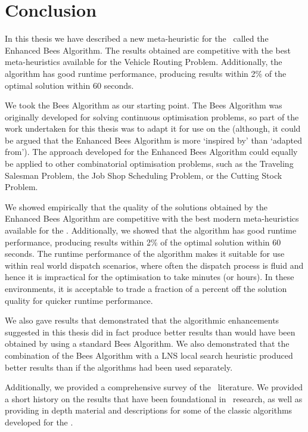 
\chapter{Conclusion}
\label{chap:conclusion}

In this thesis we have described a new meta-heuristic for the \VRP\ called the Enhanced Bees Algorithm. The results obtained are competitive with the best meta-heuristics available for the Vehicle Routing Problem. Additionally, the algorithm has good runtime performance, producing results within 2\% of the optimal solution within 60 seconds.

We took the Bees Algorithm as our starting point. The Bees Algorithm was originally developed for solving continuous optimisation problems, so part of the work undertaken for this thesis was to adapt it for use on the \VRP (although, it could be argued that the Enhanced Bees Algorithm is more `inspired by' than `adapted from'). The approach developed for the Enhanced Bees Algorithm could equally be applied to other combinatorial optimisation problems, such as the Traveling Salesman Problem, the Job Shop Scheduling Problem, or the Cutting Stock Problem.

We showed empirically that the quality of the solutions obtained by the Enhanced Bees Algorithm are competitive with the best modern meta-heuristics available for the \VRP. Additionally, we showed that the algorithm has good runtime performance, producing results within 2\% of the optimal solution within 60 seconds. The runtime performance of the algorithm makes it suitable for use within real world dispatch scenarios, where often the dispatch process is fluid and hence it is impractical for the optimisation to take minutes (or hours). In these environments, it is acceptable to trade a fraction of a percent off the solution quality for quicker runtime performance.

We also gave results that demonstrated that the algorithmic enhancements suggested in this thesis did in fact produce better results than would have been obtained by using a standard Bees Algorithm. We also demonstrated that the combination of the Bees Algorithm with a LNS local search heuristic produced better results than if the algorithms had been used separately.

Additionally, we provided a comprehensive survey of the \VRP\ literature. We provided a short history on the results that have been foundational in \VRP\ research, as well as providing in depth material and descriptions for some of the classic algorithms developed for the \VRP. 

